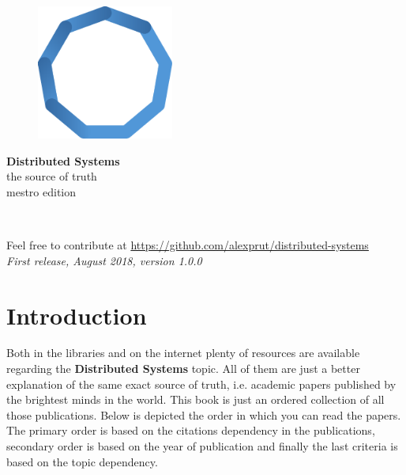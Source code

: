 \documentclass[11pt,fleqn]{book} %
\begin{document}

\begingroup
\thispagestyle{empty}
\pagecolor{cloud}\afterpage{\nopagecolor}
\centering
\vspace*{3cm}
\par\normalfont\fontsize{35}{35}\sffamily\selectfont
\begin{figure}[h]
    \centering
    \includegraphics[width=0.4\textwidth]{distributed-systems-blue.pdf}
\end{figure}
\vspace*{1cm}
\textbf{Distributed Systems}\\
{\LARGE the source of truth} \\ {\small mestro edition}\par
\vspace*{1cm}
\endgroup


\newpage
~\vfill
\thispagestyle{empty}

\noindent Feel free to contribute at \url{https://github.com/alexprut/distributed-systems}\\ %

\noindent \textit{First release, August 2018, version 1.0.0} %

 
\tableofcontents %


\chapter*{Introduction}
Both in the libraries and on the internet plenty of resources are available regarding the \textbf{Distributed Systems} topic. All of them are just a better explanation of the same exact source of truth, i.e. academic papers published by the brightest minds in the world. This book is just an ordered collection of all those publications. Below is depicted the order in which you can read the papers. The primary order is based on the citations dependency in the publications, secondary order is based on the year of publication and finally the last criteria is based on the topic dependency.
\end{document}
